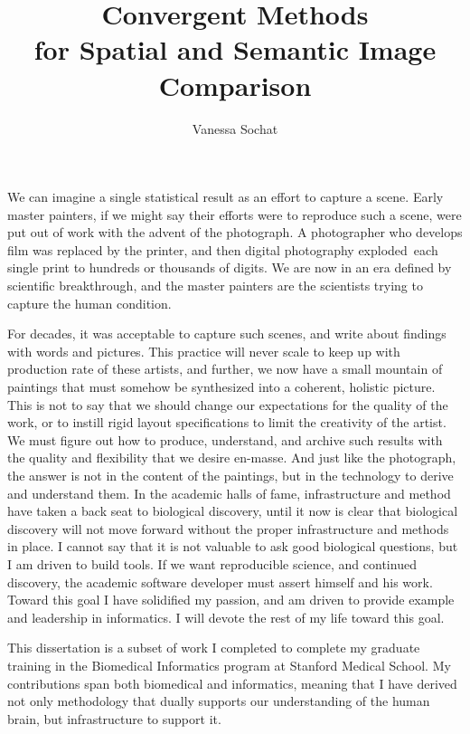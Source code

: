 \documentclass{report}
\begin{document}
\title{Convergent Methods\\
            for Spatial and Semantic Image Comparison}
\author{Vanessa Sochat}
 
\beforepreface
{}
We can imagine a single statistical result as an effort to capture a
scene. Early master painters, if we might say their efforts were to
reproduce such a scene, were put out of work with the advent of the
photograph. A photographer who develops film was replaced by the
printer, and then digital photography exploded~each single print to
hundreds or thousands of digits. We are now in an era defined by
scientific breakthrough, and the master painters are the scientists
trying to capture the human condition.

For decades, it was acceptable to capture such scenes, and write about
findings with words and pictures. This practice will never scale to keep
up with production rate of these artists, and further, we now have a
small mountain of paintings that must somehow be synthesized into a
coherent, holistic picture. This is not to say that we should change our
expectations for the quality of the work, or to instill rigid layout
specifications to limit the creativity of the artist. We must figure out
how to produce, understand, and archive such results with the quality
and flexibility that we desire en-masse. And just like the photograph,
the answer is not in the content of the paintings, but in the technology
to derive and understand them. In the academic halls of fame,
infrastructure and method have taken a back seat to biological
discovery, until it now is clear that biological discovery will not move
forward without the proper infrastructure and methods in place. I cannot
say that it is not valuable to ask good biological questions, but I am
driven to build tools. If we want reproducible science, and continued
discovery, the academic software developer must assert himself and his
work. Toward this goal I have solidified my passion, and am driven to
provide example and leadership in informatics. I will devote the rest of
my life toward this goal.

This dissertation is a subset of work I completed to complete my
graduate training in the Biomedical Informatics program at Stanford
Medical School. My contributions span both biomedical and informatics,
meaning that I have derived not only methodology that dually supports
our understanding of the human brain, but infrastructure to support it.
\end{document}
